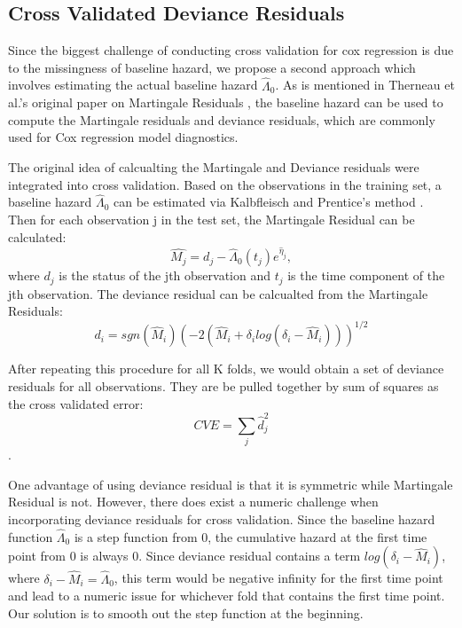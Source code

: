 \documentclass{article}\usepackage[]{graphicx}\usepackage[]{color}
\begin{document}
  \subsection{Cross Validated Deviance Residuals}
  
Since the biggest challenge of conducting cross validation for cox regression is due to the missingness of baseline hazard, we propose a second approach which involves estimating the actual baseline hazard $\hat{\Lambda}_{0}$. As is mentioned in Therneau et al.'s original paper on Martingale Residuals \citep{Therneau1990}, the baseline hazard can be used to compute the Martingale residuals and deviance residuals, which are commonly used for Cox regression model diagnostics. 

\par The original idea of calcualting the Martingale and Deviance residuals were integrated into cross validation. Based on the observations in the training set, a baseline hazard $\hat{\Lambda}_{0}$ can be estimated via Kalbfleisch and Prentice's method \citep{Kalbfleisch2011}. Then for each observation j in the test set, the Martingale Residual can be calculated: \begin{equation}\hat{M_{j}} = d_{j} -\hat{\Lambda}_{0}(t_{j})e^{\hat{\eta}_{j}},\end{equation} where $d_{j}$ is the status of the jth observation and $t_{j}$ is the time component of the jth observation. The deviance residual can be calcualted from the Martingale Residuals: \begin{equation} d_{i} = sgn(\hat{M}_{i})(-2(\hat{M}_{i} + \delta_{i}log(\delta_{i} - \hat{M}_{i})))^{1/2}\end{equation}


After repeating this procedure for all K folds, we would obtain a set of deviance residuals for all observations. They are be pulled together by sum of squares as the cross validated error:
\begin{equation}CVE = \sum_{j}\hat{d}_{j}^2\end{equation}.

One advantage of using deviance residual is that it is symmetric while Martingale Residual is not. However, there does exist a numeric challenge when incorporating deviance residuals for cross validation. Since the baseline hazard function $\hat{\Lambda}_{0}$ is a step function from 0, the cumulative hazard at the first time point from 0 is always 0. Since deviance residual contains a term $log(\delta_{i} - \hat{M}_{i})$, where $\delta_{i} - \hat{M}_{i} = \hat{\Lambda}_{0}$, this term would be negative infinity for the first time point and lead to a numeric issue for whichever fold that contains the first time point. Our solution is to smooth out the step function at the beginning.
\end{document}

